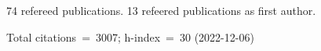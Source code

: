 74 refereed publications. 13 refeered publications as first author.

Total citations~=~3007; h-index~=~30 (2022-12-06)